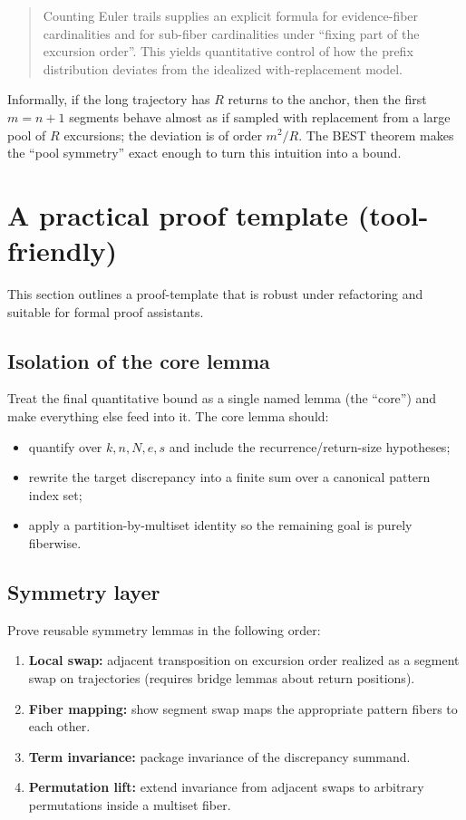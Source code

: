 \documentclass[11pt]{article}
\begin{document}
\begin{quote}
Counting Euler trails supplies an explicit formula for evidence-fiber cardinalities and for
sub-fiber cardinalities under ``fixing part of the excursion order''. This yields quantitative
control of how the prefix distribution deviates from the idealized with-replacement model.
\end{quote}

Informally, if the long trajectory has $R$ returns to the anchor, then the first $m=n+1$ segments
behave almost as if sampled with replacement from a large pool of $R$ excursions; the deviation is
of order $m^2/R$. The BEST theorem makes the ``pool symmetry'' exact enough to turn this intuition
into a bound.

\section{A practical proof template (tool-friendly)}

This section outlines a proof-template that is robust under refactoring and suitable for formal
proof assistants.

\subsection{Isolation of the core lemma}

Treat the final quantitative bound as a single named lemma (the ``core'') and make everything else
feed into it. The core lemma should:
\begin{itemize}
\item quantify over $k,n,N,e,s$ and include the recurrence/return-size hypotheses;
\item rewrite the target discrepancy into a finite sum over a canonical pattern index set;
\item apply a partition-by-multiset identity so the remaining goal is purely fiberwise.
\end{itemize}

\subsection{Symmetry layer}

Prove reusable symmetry lemmas in the following order:
\begin{enumerate}
\item \textbf{Local swap:} adjacent transposition on excursion order realized as a segment swap
on trajectories (requires bridge lemmas about return positions).
\item \textbf{Fiber mapping:} show segment swap maps the appropriate pattern fibers to each other.
\item \textbf{Term invariance:} package invariance of the discrepancy summand.
\item \textbf{Permutation lift:} extend invariance from adjacent swaps to arbitrary permutations
inside a multiset fiber.
\end{enumerate}
\end{document}
